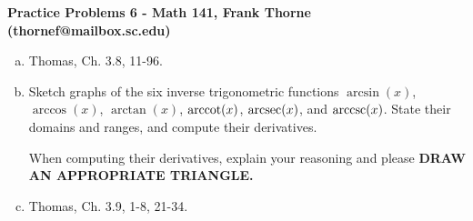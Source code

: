 \documentclass[12pt]{article}
\begin{document}
\setlength{\topmargin}{-2mm}





\begin{center}{\bf Practice Problems 6 - Math 141, Frank Thorne (thornef@mailbox.sc.edu)}
\end{center}
\begin{enumerate}[(a)]

\item
Thomas, Ch. 3.8, 11-96.

\item
Sketch graphs of the six inverse trigonometric functions $\arcsin(x)$, $\arccos(x)$, $\arctan(x)$, $\textnormal{arccot}(x)$, $\textnormal{arcsec}(x)$, and $\textnormal{arccsc}(x)$.
State their domains and ranges, and compute their derivatives.

When computing their derivatives, explain your reasoning and please {\bf DRAW AN APPROPRIATE TRIANGLE.}

\item
Thomas, Ch. 3.9, 1-8, 21-34.

\end{enumerate}
\end{document}

